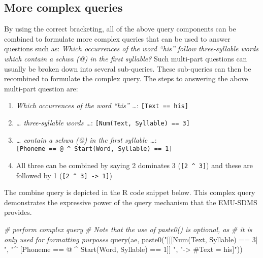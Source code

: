 \documentclass[
]{book}
\newenvironment{Shaded}{\begin{snugshade}}{\end{snugshade}}
\newcommand{\CommentTok}[1]{\textcolor[rgb]{0.56,0.35,0.01}{\textit{#1}}}
\newcommand{\FunctionTok}[1]{\textcolor[rgb]{0.00,0.00,0.00}{#1}}
\newcommand{\NormalTok}[1]{#1}
\newcommand{\StringTok}[1]{\textcolor[rgb]{0.31,0.60,0.02}{#1}}
\providecommand{\tightlist}{%
  \setlength{\itemsep}{0pt}\setlength{\parskip}{0pt}}
\begin{document}
\hypertarget{subsec:query-moreComplexQueries}{%
\subsection{More complex queries}\label{subsec:query-moreComplexQueries}}

By using the correct bracketing, all of the above query components can be combined to formulate more complex queries that can be used to answer questions such as: \emph{Which occurrences of the word ``his'' follow three-syllable words which contain a schwa (@) in the first syllable?} Such multi-part questions can usually be broken down into several sub-queries. These sub-queries can then be recombined to formulate the complex query. The steps to answering the above multi-part question are:

\begin{enumerate}
\def\labelenumi{\arabic{enumi}.}
\tightlist
\item
  \emph{Which occurrences of the word ``his'' \ldots{}}: \texttt{{[}Text\ ==\ his{]}}
\item
  \emph{\ldots{} three-syllable words \ldots{}}: \texttt{{[}Num(Text,\ Syllable)\ ==\ 3{]}}
\item
  \emph{\ldots{} contain a schwa (@) in the first syllable \ldots{}}: \texttt{{[}Phoneme\ ==\ @\ \^{}\ Start(Word,\ Syllable)\ ==\ 1{]}}
\item
  All three can be combined by saying 2 dominates 3 (\texttt{{[}2\ \^{}\ 3{]}}) and these are followed by 1 (\texttt{{[}2\ \^{}\ 3{]}\ -\textgreater{}\ 1{]}})
\end{enumerate}

The combine query is depicted in the R code snippet below. This complex query demonstrates the expressive power of the query mechanism that the EMU-SDMS provides.

\begin{Shaded}
\begin{Highlighting}[]
\CommentTok{\# perform complex query}
\CommentTok{\# Note that the use of paste0() is optional, as}
\CommentTok{\# it is only used for formatting purposes}
\FunctionTok{query}\NormalTok{(ae, }\FunctionTok{paste0}\NormalTok{(}\StringTok{"[[[Num(Text, Syllable) == 3] "}\NormalTok{,}
                 \StringTok{"\^{} [Phoneme == @ \^{} Start(Word, Syllable) == 1]] "}\NormalTok{,}
                 \StringTok{"{-}\textgreater{} \#Text = his]"}\NormalTok{))}
\end{Highlighting}
\end{Shaded}
\end{document}
